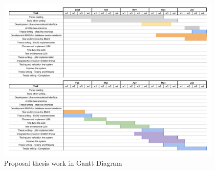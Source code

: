 \begin{figure}[ht]
    \includegraphics[width=15cm]{figs/chapter3/diagrama_gantt_split.png}
    \centering
    \caption{Proposal thesis work in Gantt Diagram}
\end{figure}